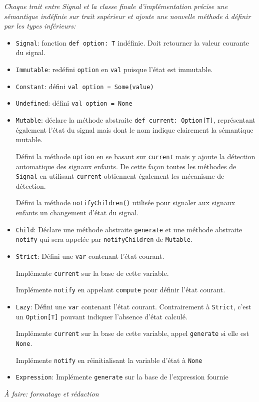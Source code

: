 \textit{Chaque trait entre Signal et la classe finale d'implémentation précise une sémantique indéfinie sur trait supérieur et ajoute une nouvelle méthode à définir par les types inférieurs:}
\begin{itemize}
	\item \texttt{Signal}: fonction \texttt{def option: T} indéfinie. Doit retourner la valeur courante du signal.
	\item \texttt{Immutable}: redéfini \texttt{option} en \texttt{val} puisque l'état est immutable.
	\item \texttt{Constant}: défini \texttt{val option = Some(value)}
	\item \texttt{Undefined}: défini \texttt{val option = None}
	\item \texttt{Mutable}: déclare la méthode abstraite \texttt{def current: Option[T]}, représentant également l'état du signal mais dont le nom indique clairement la sémantique mutable.
	
	Défini la méthode \texttt{option} en se basant sur \texttt{current} mais y ajoute la détection automatique des signaux enfants. De cette façon toutes les méthodes de \texttt{Signal} en utilisant \texttt{current} obtiennent également les mécanisme de détection.
	
	Défini la méthode \texttt{notifyChildren()} utilisée pour signaler aux signaux enfants un changement d'état du signal.
	
	\item \texttt{Child}: Déclare une méthode abstraite \texttt{generate} et une méthode abstraite \texttt{notify} qui sera appelée par \texttt{notifyChildren} de \texttt{Mutable}.
	
	\item \texttt{Strict}: Défini une \texttt{var} contenant l'état courant.
	
	Implémente \texttt{current} sur la base de cette variable.
	
	Implémente \texttt{notify} en appelant \texttt{compute} pour définir l'état courant.
	
	\item \texttt{Lazy}: Défini une \texttt{var} contenant l'état courant. Contrairement à \texttt{Strict}, c'est un \texttt{Option[T]} pouvant indiquer l'absence d'état calculé.

	Implémente \texttt{current} sur la base de cette variable, appel \texttt{generate} si elle est \texttt{None}.
	
	Implémente \texttt{notify} en réinitialisant la variable d'état à \texttt{None}
	\item \texttt{Expression}: Implémente \texttt{generate} sur la base de l'expression fournie
\end{itemize}
\textit{À faire: formatage et rédaction}


